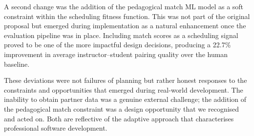 A second change was the addition of the pedagogical match ML model as a soft constraint within the scheduling fitness function. This was not part of the original proposal but emerged during implementation as a natural enhancement once the evaluation pipeline was in place. Including match scores as a scheduling signal proved to be one of the more impactful design decisions, producing a 22.7\% improvement in average instructor--student pairing quality over the human baseline.

These deviations were not failures of planning but rather honest responses to the constraints and opportunities that emerged during real-world development. The inability to obtain partner data was a genuine external challenge; the addition of the pedagogical match constraint was a design opportunity that we recognised and acted on. Both are reflective of the adaptive approach that characterises professional software development.